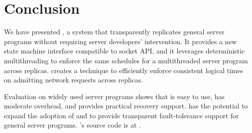 \section{Conclusion} \label{sec:conclusion}
We have presented \xxx, a \smr system that 
transparently replicates general server programs without 
requiring server developers' intervention. It provides a new state machine 
interface compatible to socket API, and it leverages 
deterministic multithreading to enforce the same schedules for a multithreaded 
server program across replicas. \xxx creates a \timealgo technique to 
efficiently enforce consistent logical times on admitting network requests 
across replicas.

Evaluation on \nprog widely used server programs shows that 
\xxx is easy to use, has moderate overhead, and provides practical recovery 
support. \xxx has the potential to expand the adoption of \smr and to provide 
transparent fault-tolerance support for general server programs. \xxx's 
source code is at \github.
